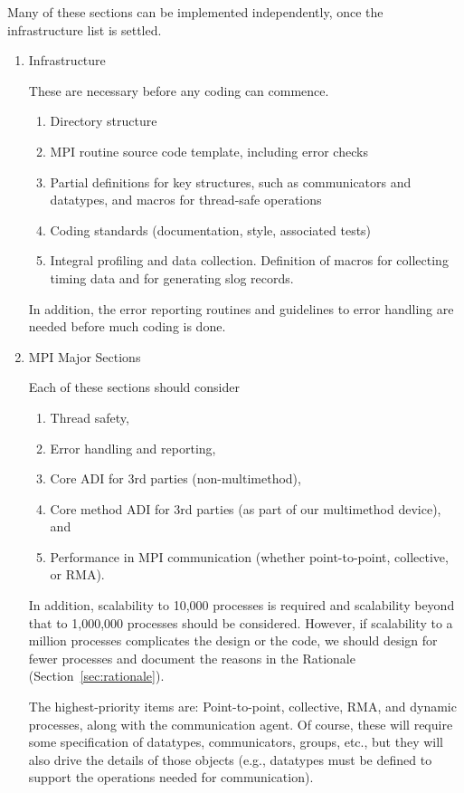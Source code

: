 \documentclass{article}
\begin{document}
Many of these sections can be implemented independently, once the
infrastructure list is settled. 
\begin{enumerate}
\item Infrastructure

  These are necessary before any coding can commence.
  \begin{enumerate}
    \item Directory structure
    \item MPI routine source code template, including error checks
    \item Partial definitions for key structures, such as communicators and
      datatypes, and macros for thread-safe operations
    \item Coding standards (documentation, style, associated tests)
    \item Integral profiling and data collection.  Definition of macros for
      collecting timing data and for generating slog records.
  \end{enumerate}
  In addition, the error reporting routines and guidelines to error handling
  are needed before much coding is done.

\item MPI Major Sections

  Each of these sections should consider
  \begin{enumerate}
    \item Thread safety,
    \item Error handling and reporting,
    \item Core ADI for 3rd parties (non-multimethod),
    \item Core method ADI for 3rd parties (as part of our multimethod device),
      and 
    \item Performance in MPI communication (whether point-to-point,
      collective, or RMA).
    \end{enumerate}
    In addition, scalability to 10,000 processes is required and scalability
    beyond that to 1,000,000 processes should be considered.  However, if
    scalability to a million processes complicates the design or the code, we
    should design for fewer processes and document the reasons in the
    Rationale (Section~\ref{sec:rationale}).

    The highest-priority items are: Point-to-point, collective, RMA, and
    dynamic processes, along with the communication agent.  Of course, these
    will require some specification of datatypes, communicators, groups, etc.,
    but they will also drive the details of those objects (e.g., datatypes
    must be defined to support the operations needed for communication).


\end{enumerate}
\end{document}
